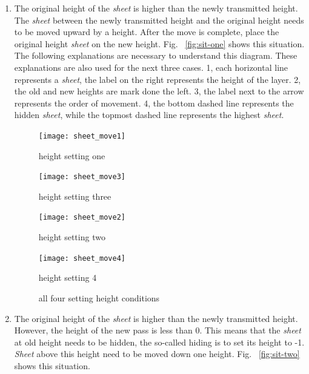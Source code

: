 \documentclass{swfcthesis}
\begin{document}
\begin{enumerate}
\item The original height of the \emph{sheet} is higher than the newly transmitted
  height. The \emph{sheet} between the newly transmitted height and the original height
  needs to be moved upward by a height. After the move is complete, place the original
  height \emph{sheet} on the new height. Fig. ~\ref{fig:sit-one} shows this situation.
  The following explanations are necessary to understand this diagram. These explanations
  are also used for the next three cases. 1, each horizontal line represents a
  \emph{sheet}, the label on the right represents the height of the layer. 2, the old and
  new heights are mark done the left. 3, the label next to the arrow represents the order
  of movement. 4, the bottom dashed line represents the hidden \emph{sheet}, while the
  topmost dashed line represents the highest \emph{sheet}.

  \begin{figure}
    \centering
    \begin{minipage}{0.45\textwidth}
        \centering
        \texttt{[image: sheet\_move1]} %
        \caption{height setting one}
        \label{fig:sit-one}
    \end{minipage}\hfill
    \begin{minipage}{0.45\textwidth}
      \centering
      \texttt{[image: sheet\_move3]} 
      \caption{height setting three}
      \label{fig:sit-three}
    \end{minipage}\hfill
    \begin{minipage}{0.45\textwidth}
      \centering
      \texttt{[image: sheet\_move2]} 
      \caption{height setting two}
      \label{fig:sit-two}
    \end{minipage}\hfill
    \begin{minipage}{0.45\textwidth}
      \centering
      \texttt{[image: sheet\_move4]} 
      \caption{height setting 4}
      \label{fig:sit-four}
    \end{minipage}
    \caption{all four setting height conditions}
\end{figure}
  

\item The original height of the \emph{sheet} is higher than the newly transmitted
  height. However, the height of the new pass is less than 0. This means that the
  \emph{sheet} at old height needs to be hidden, the so-called hiding is to set its height
  to -1. \emph{Sheet} above this height need to be moved down one
  height. Fig. ~\ref{fig:sit-two} shows this situation.
  


\end{enumerate}
\end{document}
